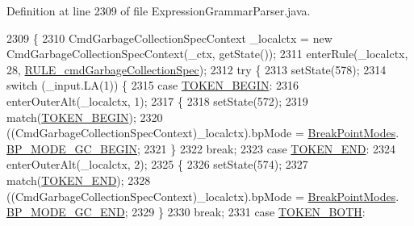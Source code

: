 Definition at line 2309 of file Expression\+Grammar\+Parser.\+java.


\begin{DoxyCode}
2309                                                                                                       \{
2310     CmdGarbageCollectionSpecContext \_localctx = \textcolor{keyword}{new} CmdGarbageCollectionSpecContext(\_ctx, getState());
2311     enterRule(\_localctx, 28, \hyperlink{classgov_1_1nasa_1_1jpf_1_1inspector_1_1server_1_1expression_1_1parser_1_1_expression_grammar_parser_a35acc820e8f7314c50355fe41ac69f8a}{RULE\_cmdGarbageCollectionSpec});
2312     \textcolor{keywordflow}{try} \{
2313       setState(578);
2314       \textcolor{keywordflow}{switch} (\_input.LA(1)) \{
2315       \textcolor{keywordflow}{case} \hyperlink{classgov_1_1nasa_1_1jpf_1_1inspector_1_1server_1_1expression_1_1parser_1_1_expression_grammar_parser_aeb1f6ac15295275b80fae4b59d753627}{TOKEN\_BEGIN}:
2316         enterOuterAlt(\_localctx, 1);
2317         \{
2318         setState(572);
2319         match(\hyperlink{classgov_1_1nasa_1_1jpf_1_1inspector_1_1server_1_1expression_1_1parser_1_1_expression_grammar_parser_aeb1f6ac15295275b80fae4b59d753627}{TOKEN\_BEGIN});
2320          ((CmdGarbageCollectionSpecContext)\_localctx).bpMode =  \hyperlink{enumgov_1_1nasa_1_1jpf_1_1inspector_1_1server_1_1breakpoints_1_1_break_point_modes}{BreakPointModes}.
      \hyperlink{enumgov_1_1nasa_1_1jpf_1_1inspector_1_1server_1_1breakpoints_1_1_break_point_modes_acd46130394bfeb9c7b8f164dcd0d59b0}{BP\_MODE\_GC\_BEGIN}; 
2321         \}
2322         \textcolor{keywordflow}{break};
2323       \textcolor{keywordflow}{case} \hyperlink{classgov_1_1nasa_1_1jpf_1_1inspector_1_1server_1_1expression_1_1parser_1_1_expression_grammar_parser_a33a806b8ed847eb31c5b5799e00c0def}{TOKEN\_END}:
2324         enterOuterAlt(\_localctx, 2);
2325         \{
2326         setState(574);
2327         match(\hyperlink{classgov_1_1nasa_1_1jpf_1_1inspector_1_1server_1_1expression_1_1parser_1_1_expression_grammar_parser_a33a806b8ed847eb31c5b5799e00c0def}{TOKEN\_END});
2328          ((CmdGarbageCollectionSpecContext)\_localctx).bpMode =  \hyperlink{enumgov_1_1nasa_1_1jpf_1_1inspector_1_1server_1_1breakpoints_1_1_break_point_modes}{BreakPointModes}.
      \hyperlink{enumgov_1_1nasa_1_1jpf_1_1inspector_1_1server_1_1breakpoints_1_1_break_point_modes_a726089f34488698c58b7693a8429cfe3}{BP\_MODE\_GC\_END}; 
2329         \}
2330         \textcolor{keywordflow}{break};
2331       \textcolor{keywordflow}{case} \hyperlink{classgov_1_1nasa_1_1jpf_1_1inspector_1_1server_1_1expression_1_1parser_1_1_expression_grammar_parser_adb1cf23ee91ded4bcbbba7860c7e27ff}{TOKEN\_BOTH}:

\end{DoxyCode}
